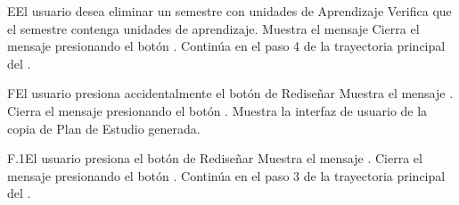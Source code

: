 \begin{UCtrayectoriaA}{E}{El usuario desea eliminar un semestre con unidades de Aprendizaje}
	\UCpaso Verifica que el semestre contenga unidades de aprendizaje.
	\UCpaso Muestra el mensaje 
	\UCpaso[\UCactor] Cierra el mensaje presionando el botón .
	\UCpaso Continúa en el paso 4 de la trayectoria principal del .
\end{UCtrayectoriaA}

\begin{UCtrayectoriaA}{F}{El usuario presiona accidentalmente el botón \BtnLapiz de Rediseñar}
	\UCpaso  Muestra el mensaje .
	\UCpaso[\UCactor] Cierra el mensaje presionando el botón .
	\UCpaso Muestra la interfaz de usuario  de la copia de Plan de Estudio generada.
\end{UCtrayectoriaA}
\begin{UCtrayectoriaA}{F.1}{El usuario presiona el botón \BtnLapiz de Rediseñar}
	\UCpaso  Muestra el mensaje .
	\UCpaso[\UCactor] Cierra el mensaje presionando el botón .
	\UCpaso Continúa en el paso 3 de la trayectoria principal del .
\end{UCtrayectoriaA}

